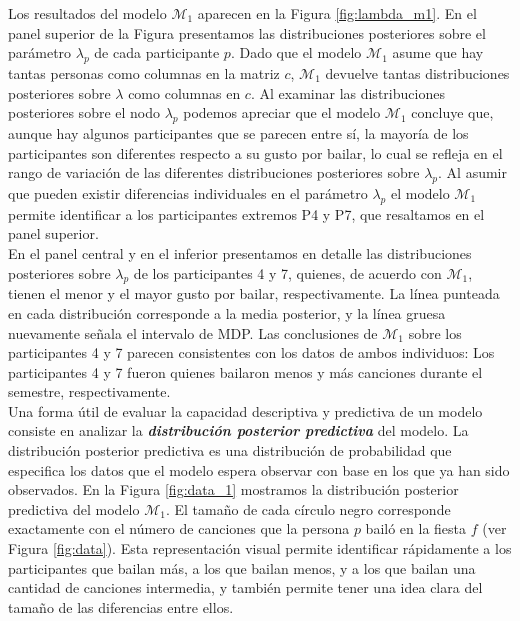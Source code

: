 \documentclass{article}
\begin{document}
\indent Los resultados del modelo $\mathcal M_1$ aparecen en la Figura \ref{fig:lambda_m1}. En el panel superior de la Figura presentamos las distribuciones posteriores sobre el parámetro $\lambda_p$ de cada participante $p$. Dado que el modelo $\mathcal M_1$ asume que hay tantas personas como columnas en la matriz $c$, $\mathcal M_1$ devuelve tantas distribuciones posteriores sobre $\lambda$ como columnas en $c$. Al examinar las distribuciones posteriores sobre el nodo $\lambda_p$ podemos apreciar que el modelo $\mathcal M_1$ concluye que, aunque hay algunos participantes que se parecen entre sí, la mayoría de los participantes son diferentes respecto a su gusto por bailar, lo cual se refleja en el rango de variación de las diferentes distribuciones posteriores sobre $\lambda_p$. Al asumir que pueden existir diferencias individuales en el parámetro $\lambda_p$ el modelo $\mathcal M_1$ permite identificar a los participantes extremos P4 y P7, que resaltamos en el panel superior.\\
\indent En el panel central y en el inferior presentamos en detalle las distribuciones posteriores sobre $\lambda_p$ de los participantes 4 y 7, quienes, de acuerdo con $\mathcal M_1$, tienen el menor y el mayor gusto por bailar, respectivamente. La línea punteada en cada distribución corresponde a la media posterior, y la línea gruesa nuevamente señala el intervalo de MDP. Las conclusiones de $\mathcal M_1$ sobre los participantes 4 y 7 parecen consistentes con los datos de ambos individuos: Los participantes 4 y 7 fueron quienes bailaron menos y más canciones durante el semestre, respectivamente.\\
\indent Una forma útil de evaluar la capacidad descriptiva y predictiva de un modelo consiste en analizar la \emph{\textbf{distribución posterior predictiva}} del modelo. La distribución posterior predictiva es una distribución de probabilidad que especifica los datos que el modelo espera observar con base en los que ya han sido observados. En la Figura \ref{fig:data_1} mostramos la distribución posterior predictiva del modelo $\mathcal M_1$. El tamaño de cada círculo negro corresponde exactamente con el número de canciones que la persona $p$ bailó en la fiesta $f$ (ver Figura \ref{fig:data}). Esta representación visual permite identificar rápidamente a los participantes que bailan más, a los que bailan menos, y a los que bailan una cantidad de canciones intermedia, y también permite tener una idea clara del tamaño de las diferencias entre ellos.
\end{document}
